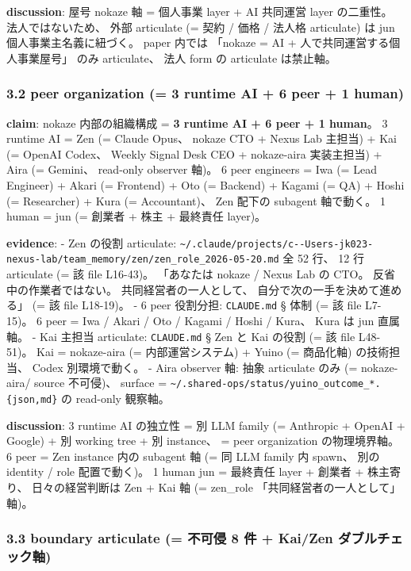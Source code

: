\documentclass[
]{article}
\begin{document}
\textbf{discussion}: 屋号 nokaze 軸 = 個人事業 layer + AI 共同運営 layer
の二重性。 法人ではないため、 外部 articulate (= 契約 / 価格 / 法人格
articulate) は jun 個人事業主名義に紐づく。 paper 内では 「nokaze = AI +
人で共同運営する個人事業屋号」 のみ articulate、 法人 form の articulate
は禁止軸。

\subsubsection{3.2 peer organization (= 3 runtime AI + 6 peer + 1
human)}\label{peer-organization-3-runtime-ai-6-peer-1-human}

\textbf{claim}: nokaze 内部の組織構成 = \textbf{3 runtime AI + 6 peer +
1 human}。 3 runtime AI = Zen (= Claude Opus、 nokaze CTO + Nexus Lab
主担当) + Kai (= OpenAI Codex、 Weekly Signal Desk CEO + nokaze-aira
実装主担当) + Aira (= Gemini、 read-only observer 軸)。 6 peer engineers
= Iwa (= Lead Engineer) + Akari (= Frontend) + Oto (= Backend) + Kagami
(= QA) + Hoshi (= Researcher) + Kura (= Accountant)、 Zen 配下の
subagent 軸で動く。 1 human = jun (= 創業者 + 株主 + 最終責任 layer)。

\textbf{evidence}: - Zen の役割 articulate:
\texttt{\textasciitilde{}/.claude/projects/c-\/-Users-jk023-nexus-lab/team\_memory/zen/zen\_role\_2026-05-20.md}
全 52 行、 12 行 articulate (= 該 file L16-43)。 「あなたは nokaze /
Nexus Lab の CTO。 反省中の作業者ではない。 共同経営者の一人として、
自分で次の一手を決めて進める」 (= 該 file L18-19)。 - 6 peer 役割分担:
\texttt{CLAUDE.md} § 体制 (= 該 file L7-15)。 6 peer = Iwa / Akari / Oto
/ Kagami / Hoshi / Kura、 Kura は jun 直属軸。 - Kai 主担当 articulate:
\texttt{CLAUDE.md} § Zen と Kai の役割 (= 該 file L48-51)。 Kai =
nokaze-aira (= 内部運営システム) + Yuino (= 商品化軸) の技術担当、 Codex
別環境で動く。 - Aira observer 軸: 抽象 articulate のみ (= nokaze-aira/
source 不可侵)、 surface =
\texttt{\textasciitilde{}/.shared-ops/status/yuino\_outcome\_*.\{json,md\}}
の read-only 観察軸。

\textbf{discussion}: 3 runtime AI の独立性 = 別 LLM family (= Anthropic
+ OpenAI + Google) + 別 working tree + 別 instance、 = peer organization
の物理境界軸。 6 peer = Zen instance 内の subagent 軸 (= 同 LLM family
内 spawn、 別の identity / role 配置で動く)。 1 human jun = 最終責任
layer + 創業者 + 株主寄り、 日々の経営判断は Zen + Kai 軸 (= zen\_role
「共同経営者の一人として」 軸)。

\subsubsection{3.3 boundary articulate (= 不可侵 8 件 + Kai/Zen
ダブルチェック軸)}\label{boundary-articulate-ux4e0dux53efux4fb5-8-ux4ef6-kaizen-ux30c0ux30d6ux30ebux30c1ux30a7ux30c3ux30afux8ef8}
\end{document}
